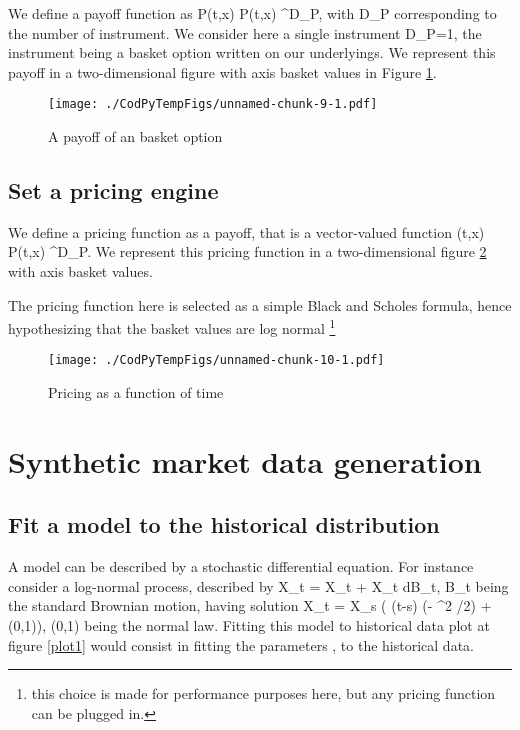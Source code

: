 \documentclass[]{article}
\def\({}%
\def\){}%
\numberwithin{equation}{section}
\newcommand \RR    {\mathbb{R}}
\begin{document}
We define a payoff function as \(P(t,x) \mapsto P(t,x) \in \RR^{D_P}\),
with \(D_P\) corresponding to the number of instrument. We consider here
a single instrument \(D_P=1\), the instrument being a basket option
written on our underlyings. We represent this payoff in a
two-dimensional figure with axis basket values in Figure \ref{plot2}.

\begin{figure}
\centering
\texttt{[image: ./CodPyTempFigs/unnamed-chunk-9-1.pdf]}
\caption{\label{plot2} A payoff of an basket option}
\end{figure}

\newpage

\subsection{Set a pricing engine}\label{set-a-pricing-engine}

We define a pricing function as a payoff, that is a vector-valued
function \((t,x) \mapsto P(t,x) \in \RR^{D_P}\). We represent this
pricing function in a two-dimensional figure \ref{plot3} with axis
basket values.

The pricing function here is selected as a simple Black and Scholes
formula, hence hypothesizing that the basket values are log normal
\footnote{this choice is made for performance purposes here, but any pricing function can be plugged in.}

\begin{figure}
\centering
\texttt{[image: ./CodPyTempFigs/unnamed-chunk-10-1.pdf]}
\caption{\label{plot3} Pricing as a function of time}
\end{figure}

\newpage

\section{Synthetic market data
generation}\label{synthetic-market-data-generation}

\subsection{Fit a model to the historical
distribution}\label{fit-a-model-to-the-historical-distribution}

A model can be described by a stochastic differential equation. For
instance consider a log-normal process, described by
\(X_t = \mu X_t + X_t \sigma dB_t\), \(B_t\) being the standard Brownian
motion, having solution
\(X_t = X_s \exp( (t-s) (\mu - \sigma^2 /2) +  \sigma {}(0,1))\),
\((0,1)\) being the normal law. Fitting this model to
historical data plot at figure \ref{plot1} would consist in fitting the
parameters \(\mu,\sigma\) to the historical data.
\end{document}
